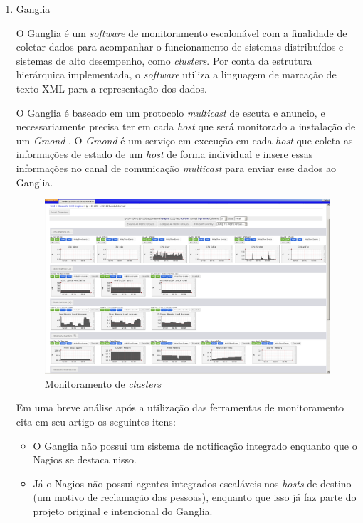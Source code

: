 \begin{enumerate}
\item Ganglia

 O Ganglia é um \textit{software} de monitoramento escalonável com a finalidade de coletar dados para acompanhar o funcionamento de sistemas distribuídos e sistemas de alto desempenho, como \textit{clusters}. Por conta da estrutura hierárquica implementada, o \textit{software} utiliza a linguagem de marcação de texto XML para a representação dos dados. 
 
 O Ganglia é baseado em um protocolo \textit{multicast} de escuta e anuncio, e necessariamente precisa ter em cada \textit{host} que será monitorado a instalação de um \textit{Gmond} \cite{vyas2014embedding}. O \textit{Gmond} é um serviço em execução em cada \textit{host} que coleta as informações de estado de um \textit{host} de forma individual e insere essas informações no canal de comunicação \textit{multicast} para enviar esse dados ao Ganglia.
 
 \begin{figure}[h!]
	\begin{center}
	\includegraphics[scale = 0.50]{img/1024px-ScalableGridEngineGanglia2.png}
		\caption{Monitoramento de \textit{clusters} \cite{Ganglia}}
		\label{fun:fig:ganglia}
	\end{center}
\end{figure}
 
 
 Em uma breve análise após a utilização das ferramentas de monitoramento \cite{benincosa2ganglia} cita em seu artigo os seguintes itens:
\begin{itemize}

\item O Ganglia não possui um sistema de notificação integrado enquanto que o Nagios se destaca nisso.
\item Já o Nagios não possui agentes integrados escaláveis nos \textit{hosts} de destino (um motivo de reclamação das pessoas), enquanto que isso já faz parte do projeto original e intencional do Ganglia.


\end{itemize}
\end{enumerate}
